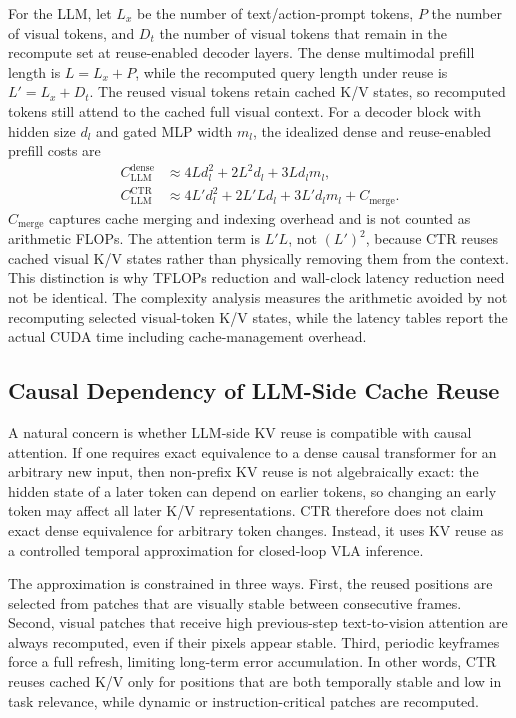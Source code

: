 For the LLM, let $L_x$ be the number of text/action-prompt tokens, $P$ the number of visual tokens, and $D_t$ the number of visual tokens that remain in the recompute set at reuse-enabled decoder layers.
The dense multimodal prefill length is $L=L_x+P$, while the recomputed query length under reuse is $L'=L_x+D_t$.
The reused visual tokens retain cached K/V states, so recomputed tokens still attend to the cached full visual context.
For a decoder block with hidden size $d_l$ and gated MLP width $m_l$, the idealized dense and reuse-enabled prefill costs are
\begin{align}
    C_{\mathrm{LLM}}^{\mathrm{dense}} &\approx 4L d_l^2 + 2L^2 d_l + 3L d_l m_l, \\
    C_{\mathrm{LLM}}^{\mathrm{CTR}} &\approx 4L' d_l^2 + 2L' L d_l + 3L' d_l m_l + C_{\mathrm{merge}}.
\end{align}
$C_{\mathrm{merge}}$ captures cache merging and indexing overhead and is not counted as arithmetic FLOPs.
The attention term is $L' L$, not $(L')^2$, because CTR reuses cached visual K/V states rather than physically removing them from the context.
This distinction is why TFLOPs reduction and wall-clock latency reduction need not be identical.
The complexity analysis measures the arithmetic avoided by not recomputing selected visual-token K/V states, while the latency tables report the actual CUDA time including cache-management overhead.

\subsection{Causal Dependency of LLM-Side Cache Reuse}
A natural concern is whether LLM-side KV reuse is compatible with causal attention.
If one requires exact equivalence to a dense causal transformer for an arbitrary new input, then non-prefix KV reuse is not algebraically exact: the hidden state of a later token can depend on earlier tokens, so changing an early token may affect all later K/V representations.
CTR therefore does not claim exact dense equivalence for arbitrary token changes.
Instead, it uses KV reuse as a controlled temporal approximation for closed-loop VLA inference.

The approximation is constrained in three ways.
First, the reused positions are selected from patches that are visually stable between consecutive frames.
Second, visual patches that receive high previous-step text-to-vision attention are always recomputed, even if their pixels appear stable.
Third, periodic keyframes force a full refresh, limiting long-term error accumulation.
In other words, CTR reuses cached K/V only for positions that are both temporally stable and low in task relevance, while dynamic or instruction-critical patches are recomputed.

